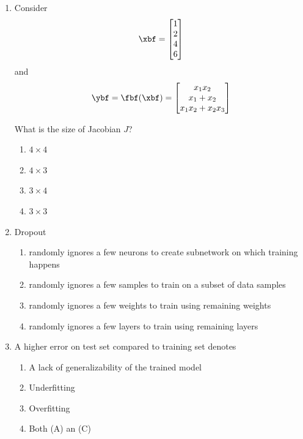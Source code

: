\documentclass[11pt, xcolor=dvipsnames,svgnames,x11names]{article}
\begin{document}
\begin{enumerate}
\item Consider
\begin{align*}
\xbf = \begin{bmatrix}
1 \\ 2 \\ 4 \\ 6
\end{bmatrix}
\end{align*}
and 
\begin{align*}
\ybf = \fbf(\xbf) = \begin{bmatrix}
x_1 x_2 \\
x_1 + x_2\\
x_1x_2 + x_2x_3
\end{bmatrix}
\end{align*}

What is the size of Jacobian $J$?
\begin{enumerate}
\item  $4 \times 4$
\item $ 4\times 3$
\item $ 3\times 4$
\item $ 3 \times 3$
\end{enumerate}

\item Dropout 

\begin{enumerate}
\item randomly ignores a few neurons to create subnetwork on which training happens
\item randomly ignores a few samples to train on a subset of data samples
\item randomly ignores a few weights to train using remaining weights
\item randomly ignores a few layers to train using remaining layers
\end{enumerate}


\item A higher error on test set compared to training set denotes
\begin{enumerate}
\item A lack of generalizability of the trained model
\item Underfitting
\item Overfitting
\item Both (A) an (C)
\end{enumerate}

\end{enumerate}
\end{document}
